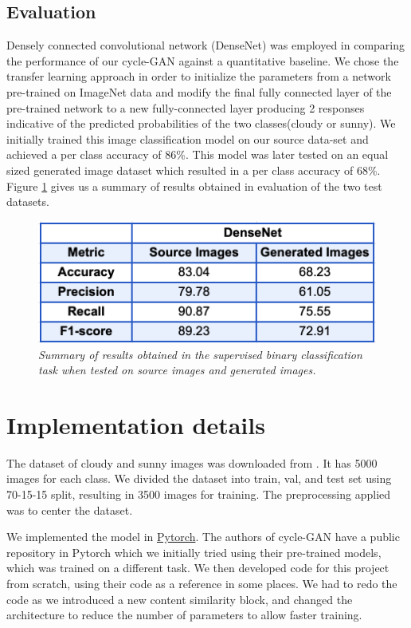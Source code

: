 \documentclass[10pt,twocolumn,letterpaper]{article}
\begin{document}
\subsection{Evaluation}
Densely connected convolutional network (DenseNet) was employed in comparing the performance of our cycle-GAN against a quantitative baseline. We chose the transfer learning approach in order to initialize the parameters from a network pre-trained on ImageNet data and modify the final fully connected layer of the pre-trained network to a new fully-connected layer producing 2 responses indicative of the predicted probabilities of the two classes(cloudy or sunny). We initially trained this image classification model on our source data-set and achieved a per class accuracy of 86\%. This model was later tested on an equal sized generated image dataset which resulted in a per class accuracy of 68\%. Figure \ref{fig:eval} gives us a summary of results obtained in evaluation of the two test datasets.
\begin{figure}[htbp]
    \begin{center}
        \includegraphics[width=0.9\linewidth]{images/Evaluation.png}
    \end{center}
   \caption{\textit{Summary of results obtained in the supervised binary classification task when tested on source images and generated images. }}
    \label{fig:eval}
\end{figure}

\section{Implementation details}
The dataset of cloudy and sunny images was downloaded from \cite{lu2014two}. It has 5000 images for each class. We divided the dataset into train, val, and test set using 70-15-15 split, resulting in 3500 images for training. The preprocessing applied was to center the dataset.

We implemented the model in \href{https://pytorch.org/}{Pytorch}. The authors of cycle-GAN have a public repository in Pytorch which we initially tried using their pre-trained models, which was trained on a different task. We then developed code for this project from scratch, using their code as a reference in some places. We had to redo the code as we introduced a new content similarity block, and changed the architecture to reduce the number of parameters to allow faster training.
\end{document}
